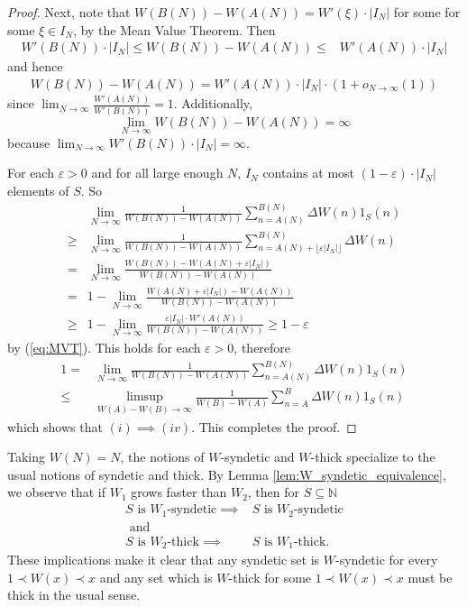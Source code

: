 \documentclass[12pt]{article}
\theoremstyle{plain} %
\theoremstyle{definition} %
\theoremstyle{plain}
\theoremstyle{plain}
\numberwithin{equation}{section}
\newcommand{\N}{\mathbb{N}}
\renewcommand{\epsilon}{\varepsilon}
\renewcommand{\leq}{\leqslant}
\renewcommand{\geq}{\geqslant}
\renewcommand{\subset}{\subseteq}
\newcommand{\1}{\mathbbm{1}}
\newcommand{\oo}{\infty}
\begin{document}
\begin{proof}
Next, note that $W(B(N))-W(A(N)) = W'(\xi)\cdot |I_N|$ for some for some $\xi\in I_N$, by the Mean Value Theorem. Then 
\begin{align}\label{eq:MVT}
W'(B(N))\cdot |I_N|\leq W(B(N))-W(A(N)) \leq &W'(A(N))\cdot |I_N|
\end{align}
and hence 
\begin{align}\label{eq:MVT_2}
W(B(N))-W(A(N)) = W'(A(N))\cdot |I_N|\cdot (1+o_{N\to\oo}(1))
\end{align}
since $\lim_{N\to\oo}\frac{W'(A(N))}{W'(B(N))} = 1$. Additionally, 
$$
\lim_{N\to\oo}W(B(N))-W(A(N))=\oo
$$
because $\lim_{N\to\oo}W'(B(N))\cdot |I_N|= \oo$.

For each $\epsilon>0$ and for all large enough $N$, $I_N$ contains at most $(1-\epsilon)\cdot |I_N|$ elements of $S$. So 
\begin{align*}
    &\lim_{N\to\oo}\frac{1}{W(B(N))-W(A(N))}\sum_{n=A
(N)}^{B(N)}\Delta W(n)1_{S}(n)\\
 \geq &\lim_{N\to\oo}\frac{1}{W(B(N))-W(A(N))}\sum_{n=A(N)+\lfloor{\epsilon |I_N|\rfloor}}^{B(N)}\Delta W(n)\\
=& \lim_{N\to\oo}\frac{W(B(N))-W(A(N)+{\epsilon |I_N|})}{W(B(N))-W(A(N))}\\
=&1- \lim_{N\to\oo}\frac{W(A(N)+\epsilon |I_N|)-W(A(N))}{W(B(N))-W(A(N))}\\
\geq &1- \lim_{N\to\oo}\frac{\epsilon |I_N|\cdot W'(A
(N))}{W(B(N))-W(A(N))} \geq 1-\epsilon
\end{align*}
by (\ref{eq:MVT}). This holds for each $\epsilon>0$, therefore
\begin{align*}
1=&\lim_{N\to\oo}\frac{1}{W(B(N))-W(A(N))}\sum_{n=A
(N)}^{B(N)}\Delta W(n)1_{S}(n)\\\leq &\limsup_{W(A)-W(B)\to\oo}\frac{1}{W(B)-W(A)}\sum_{n=A
}^{B}\Delta W(n)1_{S}(n)
\end{align*}
which shows that $(i)\implies(iv)$. This completes the proof.
     
\end{proof}


Taking $W(N)=N$, the notions of $W$-syndetic and $W$-thick specialize to the usual notions of syndetic and thick. By Lemma \ref{lem:W_syndetic_equivalence}, we observe that if $W_1$ grows faster than $W_2$, then for $S\subset \N$
\begin{align*} 
S\text{ is } W_1\text{-syndetic}\implies &S\text{ is } W_2\text{-syndetic}\\
\text{ and} \\
S\text{ is } W_2\text{-thick}\implies &S\text{ is } W_1\text{-thick}.
\end{align*}
These implications make it clear that any syndetic set is $W$-syndetic for every $1\prec W(x)\prec x$ and any set which is $W$-thick for some $1\prec W(x)\prec x$ must be thick in the usual sense.
\end{document}

